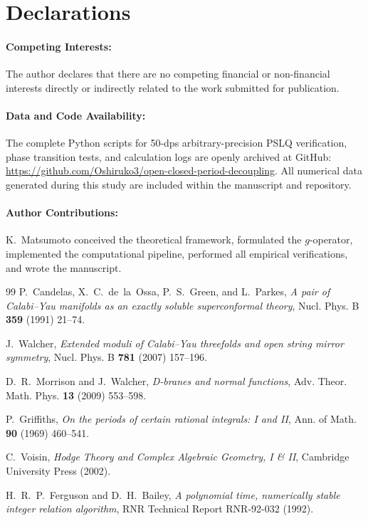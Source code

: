 \documentclass[11pt,a4paper]{article}
\theoremstyle{definition}
\begin{document}
\section*{Declarations}

\paragraph{Competing Interests:}
The author declares that there are no competing financial or non-financial interests directly or indirectly related to the work submitted for publication.

\paragraph{Data and Code Availability:}
The complete Python scripts for 50-dps arbitrary-precision PSLQ verification, phase transition tests, and calculation logs are openly archived at GitHub:\\
\url{https://github.com/Oshiruko3/open-closed-period-decoupling}. All numerical data generated during this study are included within the manuscript and repository.

\paragraph{Author Contributions:}
K.~Matsumoto conceived the theoretical framework, formulated the $g$-operator, implemented the computational pipeline, performed all empirical verifications, and wrote the manuscript.

\begin{thebibliography}{99}
P.~Candelas, X.~C.~de~la~Ossa, P.~S.~Green, and L.~Parkes,
\emph{A pair of Calabi--Yau manifolds as an exactly soluble superconformal theory},
Nucl. Phys. B \textbf{359} (1991) 21--74.

J.~Walcher,
\emph{Extended moduli of Calabi--Yau threefolds and open string mirror symmetry},
Nucl. Phys. B \textbf{781} (2007) 157--196.

D.~R.~Morrison and J.~Walcher,
\emph{D-branes and normal functions},
Adv. Theor. Math. Phys. \textbf{13} (2009) 553--598.

P.~Griffiths,
\emph{On the periods of certain rational integrals: I and II},
Ann. of Math. \textbf{90} (1969) 460--541.

C.~Voisin,
\emph{Hodge Theory and Complex Algebraic Geometry, I \& II},
Cambridge University Press (2002).

H.~R.~P.~Ferguson and D.~H.~Bailey,
\emph{A polynomial time, numerically stable integer relation algorithm},
RNR Technical Report RNR-92-032 (1992).

\end{thebibliography}
\end{document}
